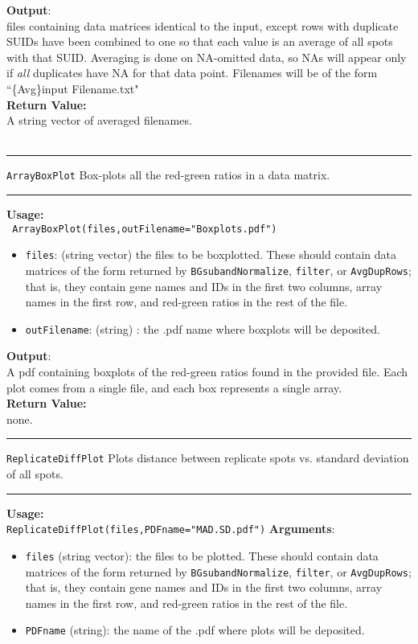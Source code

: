 \documentclass[10pt]{article}
\newcommand{\fquote}{``}
\begin{document}
\textbf{Output}:\\
files containing data matrices identical to the input, except rows with duplicate SUIDs have been combined to one so that each value is an average of all spots with that SUID. Averaging is done on NA-omitted data, so NAs will appear only if \emph{all} duplicates have NA for that data point. Filenames will be of the form \fquote \{Avg\}\textunderscore input Filename.txt"\\
  \textbf{Return Value:}\\ A string vector of averaged filenames.\\\\
  \rule{\linewidth}{0.4pt}
  \texttt{ArrayBoxPlot} \hspace{1in} Box-plots all the red-green ratios in a data matrix.\\
    \rule{\linewidth}{0.4pt}
\textbf{Usage:}\\
\texttt{ ArrayBoxPlot(files,outFilename="Boxplots.pdf")}
\begin{itemize}
     	\item \texttt{files}: (string vector) the files to be boxplotted. These should contain data matrices of the form returned by \texttt{BGsubandNormalize}, \texttt{filter}, or \texttt{AvgDupRows}; that is, they contain gene names and IDs in the first two columns, array names in the first row, and red-green ratios in the rest of the file.
     	\item \texttt{outFilename}: (string) :  the .pdf name where boxplots will be deposited.
\end{itemize}

\textbf{Output}:\\ A pdf containing boxplots of the red-green ratios found in the provided file. Each plot comes from a single file, and each box represents a single array.\\
  \textbf{Return Value:}\\  none.\\ %
  \rule{\linewidth}{0.4pt}
  \texttt{ReplicateDiffPlot} \hspace{.6in} Plots distance between replicate spots vs. standard deviation of all spots.\\
    \rule{\linewidth}{0.4pt}
\textbf{Usage:}\\
\texttt{ReplicateDiffPlot(files,PDFname="MAD.SD.pdf")}
\textbf{Arguments}:
  \begin{itemize}
     	\item \texttt{files} (string vector): the files to be plotted. These should contain data matrices of the form returned by \texttt{BGsubandNormalize}, \texttt{filter}, or \texttt{AvgDupRows}; that is, they contain gene names and IDs in the first two columns, array names in the first row, and red-green ratios in the rest of the file.
     	\item \texttt{PDFname} (string): the name of the .pdf where plots will be deposited.
    
\end{itemize}
\end{document}
